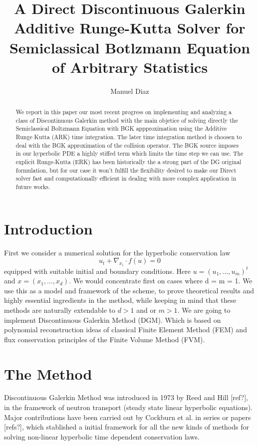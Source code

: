 \documentclass[a4paper,10pt]{article}
\title{A Direct Discontinuous Galerkin Additive Runge-Kutta Solver 
for Semiclassical Botlzmann Equation of Arbitrary Statistics}
\author{Manuel Diaz}
\begin{document}
\maketitle

\begin{abstract}
We report in this paper our most recent progress on implementing and analyzing a class of Discontinuous Galerkin method with the main objetice of solving directly the Semiclassical Boltzmann Equation with BGK appproximation using the Additive Runge Kutta (ARK) time integration. The later time integration method is choosen to deal with the BGK approximation of the collision operator. The BGK source imposes in our hyperbolic PDE a highly stiffed term which limits the time step we can use. The explicit Runge-Kutta (ERK) has been historically the a strong part of the DG original formulation, but for our case it won't fulfill the flexibility desired to make our Direct solver fast and computationally efficient in dealing with more complex application in future works.

\end{abstract}

\section{Introduction}
First we consider a numerical solution for the hyperbolic conservation law
\begin{equation}
 u_t + \nabla_{x_i} \cdot f(u) = 0
\end{equation}
equipped with suitable initial and boundary conditions. Here
$ u = (u_1, \dots , u_m)^t$ and $x = (x_1, \dots , x_d)$. 
We would concentrate first on cases where d = m = 1. We use this as a model and framework of the scheme, to prove theoretical results and highly essential ingredients in the method, while keeping in mind that these methods are naturally extendable to $d > 1$ and or $m > 1$.
We are going to implement Discontinuous Galerkin Method (DGM). Which is based on polynomial reconstruction ideas of classical Finite Element Method (FEM) and flux conservation principles of the Finite Volume Method (FVM).

\section{The Method}
Discontinuous Galerkin Method was introduced in 1973 by Reed and Hill [ref?], in the framework of neutron transport (steady state linear hyperbolic equations). Major contributions have been carried out by Cockburn et al. in series or papers [refs?], which stablished a initial framework for all the new kinds of methods for solving non-linear hyperbolic time dependent conservation laws.
\end{document}
